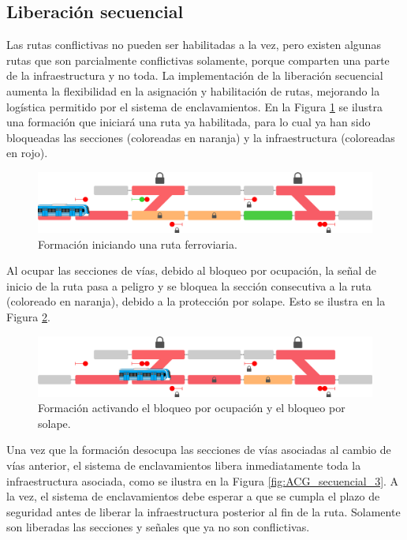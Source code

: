 \subsection{Liberación secuencial}

	\label{sec:ACG_liberacion}
	
	Las rutas conflictivas no pueden ser habilitadas a la vez, pero existen algunas rutas que son parcialmente conflictivas solamente, porque comparten una parte de la infraestructura y no toda. La implementación de la liberación secuencial aumenta la flexibilidad en la asignación y habilitación de rutas, mejorando la logística permitido por el sistema de enclavamientos. En la Figura \ref{fig:ACG_secuencial_1} se ilustra una formación que iniciará una ruta ya habilitada, para lo cual ya han sido bloqueadas las secciones (coloreadas en naranja) y la infraestructura (coloreadas en rojo).
	
	 \begin{figure}[!h]
	     \centering
	     \includegraphics[width=1\textwidth]{Figuras/secuencial_1}
	     \centering\caption{Formación iniciando una ruta ferroviaria.}
	     \label{fig:ACG_secuencial_1}
	 \end{figure}
 
	Al ocupar las secciones de vías, debido al bloqueo por ocupación, la señal de inicio de la ruta pasa a peligro y se bloquea la sección consecutiva a la ruta (coloreado en naranja), debido a la protección por solape. Esto se ilustra en la Figura \ref{fig:ACG_secuencial_2}.
	
	\begin{figure}[!h]
    	 \centering
	     \includegraphics[width=1\textwidth]{Figuras/secuencial_2}
    	 \centering\caption{Formación activando el bloqueo por ocupación y el bloqueo por solape.}
    	 \label{fig:ACG_secuencial_2}
	\end{figure}
 
 	Una vez que la formación desocupa las secciones de vías asociadas al cambio de vías anterior, el sistema de enclavamientos libera inmediatamente toda la infraestructura asociada, como se ilustra en la Figura \ref{fig:ACG_secuencial_3}. A la vez, el sistema de enclavamientos debe esperar a que se cumpla el plazo de seguridad antes de liberar la infraestructura posterior al fin de la ruta. Solamente son liberadas las secciones y señales que ya no son conflictivas.
	   
